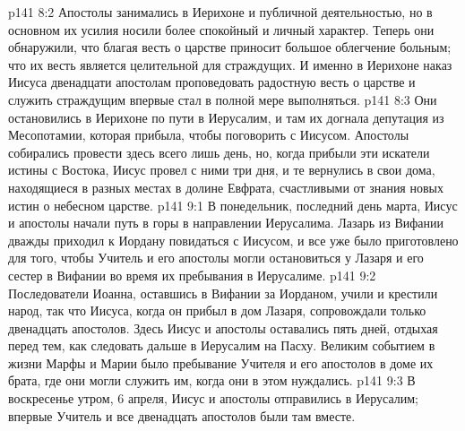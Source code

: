 \vs p141 8:2 Апостолы занимались в Иерихоне и публичной деятельностью, но в основном их усилия носили более спокойный и личный характер. Теперь они обнаружили, что благая весть о царстве приносит большое облегчение больным; что их весть является целительной для страждущих. И именно в Иерихоне наказ Иисуса двенадцати апостолам проповедовать радостную весть о царстве и служить страждущим впервые стал в полной мере выполняться.
\vs p141 8:3 Они остановились в Иерихоне по пути в Иерусалим, и там их догнала депутация из Месопотамии, которая прибыла, чтобы поговорить с Иисусом. Апостолы собирались провести здесь всего лишь день, но, когда прибыли эти искатели истины с Востока, Иисус провел с ними три дня, и те вернулись в свои дома, находящиеся в разных местах в долине Евфрата, счастливыми от знания новых истин о небесном царстве.
\vs p141 9:1 В понедельник, последний день марта, Иисус и апостолы начали путь в горы в направлении Иерусалима. Лазарь из Вифании дважды приходил к Иордану повидаться с Иисусом, и все уже было приготовлено для того, чтобы Учитель и его апостолы могли остановиться у Лазаря и его сестер в Вифании во время их пребывания в Иерусалиме.
\vs p141 9:2 Последователи Иоанна, оставшись в Вифании за Иорданом, учили и крестили народ, так что Иисуса, когда он прибыл в дом Лазаря, сопровождали только двенадцать апостолов. Здесь Иисус и апостолы оставались пять дней, отдыхая перед тем, как следовать дальше в Иерусалим на Пасху. Великим событием в жизни Марфы и Марии было пребывание Учителя и его апостолов в доме их брата, где они могли служить им, когда они в этом нуждались.
\vs p141 9:3 В воскресенье утром, 6 апреля, Иисус и апостолы отправились в Иерусалим; впервые Учитель и все двенадцать апостолов были там вместе.
